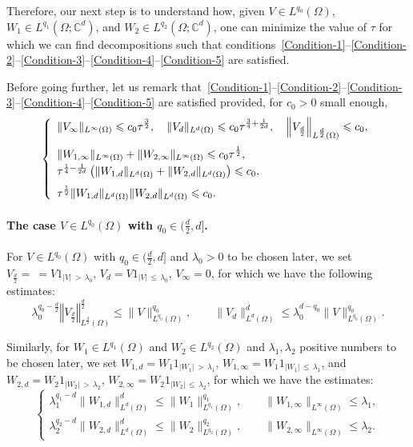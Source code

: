 \documentclass[AHL,Unicode,longabstracts]{cedram}
\newcommand*\C{\mathbb{C}}
\newcommand*\ds{\displaystyle}
\newcommand{\norm}[1]{\left\Vert#1\right\Vert}
\renewcommand{\leq}{\leqslant}
\begin{document}
Therefore, our next step is to understand how, given $V \in L^{q_0}(\Omega)$, $W_1 \in L^{q_1}(\Omega; \C^d)$, and $W_2 \in L^{q_2}(\Omega; \C^d)$, one can minimize the value of $\tau$ for which we can find decompositions such that conditions~\eqref{Condition-1}--\eqref{Condition-2}--\eqref{Condition-3}--\eqref{Condition-4}--\eqref{Condition-5} are satisfied.

Before going further, let us remark that~\eqref{Condition-1}--\eqref{Condition-2}--\eqref{Condition-3}--\eqref{Condition-4}--\eqref{Condition-5} are satisfied provided, for $c_0 >0$ small enough,
\begin{equation}\label{Conditions-Summary}
\left\{
\begin{array}{l}
\ds \| V_\infty \|_{L^\infty(\Omega)} \leq c_0 \tau^{\frac{3}{2}},
\quad
\| V_d\|_{L^{d}(\Omega)} \leq c_0 \tau^{\frac{3}{4} + \frac{1}{2d}},
\quad
\norm{ V_{\frac{d}{2}}}_{L^{\frac{d}{2}}(\Omega)} \leq c_0,
\medskip
\\
\ds \| W_{1, \infty} \|_{L^\infty(\Omega)}+ \| W_{2, \infty} \|_{L^\infty(\Omega)} \leq c_0 \tau^{\frac{1}{2}},\\[0.20em]
\tau^{\frac{1}{4} - \frac{1}{2d}} \left(\| W_{1,d} \|_{L^d(\Omega)} + \| W_{2, d} \|_{L^d(\Omega)}\right) \leq c_0,
\medskip
\\
\ds
\tau^{\frac{1}{2}} \| W_{1,d} \|_{L^d(\Omega)} \| W_{2, d} \|_{L^d(\Omega)} \leq c_0.
\end{array}\right.
\end{equation}
\paragraph{The case $V \in L^{q_0}(\Omega)$ with $q_0 \in (\frac{d}{2}, d]$.}
For $V \in L^{q_0}(\Omega)$ with $q_0 \in (\frac{d}{2}, d]$ and $\lambda_0>0$ to be chosen later, we set $V_{\frac{d}{2}} = \ = V 1_{|V|\,>\,\lambda_0}$, $ V_d = V 1_{|V|\,\leq\,\lambda_0}$, $V_\infty = 0$, for which we have the following estimates:
\[
\lambda_0^{q_0-\frac{d}{2}} \norm{V_{\frac{d}{2}}}_{L^{\frac{d}{2}}(\Omega)}^{\frac{d}{2}} \leq \| V \|_{L^{q_0}(\Omega)}^{q_0},
\qquad
\| V_{d} \|_{L^d(\Omega)}^d \leq \lambda_0^{d - q_0} \| V \|_{L^{q_0}(\Omega)}^{q_0}.
\]

Similarly, for $W_1 \in L^{q_1}(\Omega)$ and $W_2 \in L^{q_2}(\Omega)$ and $\lambda_1, \lambda_2$ positive numbers to be chosen later, we set $W_{1,d} = W_1 1_{|W_1|\, >\,\lambda_1}$, $W_{1, \infty} = W_1 1_{|W_1|\,\leq\, \lambda_1}$, and $W_{2,d} = W_2 1_{|W_2|\,>\, \lambda_2}$, $W_{2, \infty} = W_2 1_{|W_2|\,\leq\,\lambda_2}$, for which we have the estimates:
\begin{equation}\label{Est-W-1-d-infty}
\left\{
\begin{array}{l}
\ds \lambda_1^{q_1-d} \| W_{1,d}\|_{L^{d}(\Omega)}^{d} \leq \| W_1 \|_{L^{q_1}(\Omega)}^{q_1},
\qquad
\| W_{1,\infty} \|_{L^\infty(\Omega)} \leq \lambda_1,
\\[0.15em]
\lambda_2^{q_2-d} \| W_{2,d}\|_{L^{d}(\Omega)}^{d} \leq \| W_2 \|_{L^{q_2}(\Omega)}^{q_2},
\qquad
\| W_{2,\infty} \|_{L^\infty(\Omega)} \leq \lambda_2.
\end{array}
\right.
\end{equation}
\end{document}
